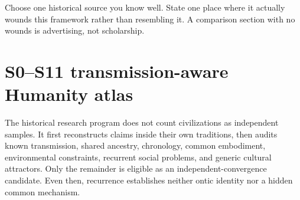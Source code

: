 \documentclass[11pt]{article}
\begin{document}
\begin{readercheck}
Choose one historical source you know well. State one place where it actually wounds this framework rather than resembling it. A comparison section with no wounds is advertising, not scholarship.
\end{readercheck}

\section{S0--S11 transmission-aware Humanity atlas}

The historical research program does not count civilizations as independent
samples.  It first reconstructs claims inside their own traditions, then audits
known transmission, shared ancestry, chronology, common embodiment,
environmental constraints, recurrent social problems, and generic cultural
attractors.  Only the remainder is eligible as an independent-convergence
candidate.  Even then, recurrence establishes neither ontic identity nor a hidden
common mechanism.
\end{document}
